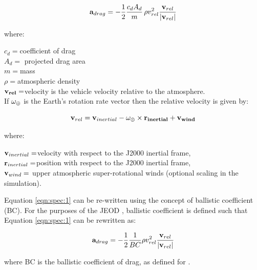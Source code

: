 \begin{equation}
{\bf{a}}_{drag}  =  - \frac{1}{2}\frac{{c_d A_d }}{m}\,\rho v^2 _{rel} \frac{{{\bf{v}}_{rel} }}{{\left| {{\bf{v}}_{rel} } \right|}}\label{eqn:spec:1}
\end{equation}

where:

$c_{d} =$coefficient of drag \\
$A_{d} =$ projected drag area \\
$m = $mass \\
$\rho  = $atmospheric density \\
$\bf{v}_{rel} = $velocity is the vehicle velocity relative to the atmosphere.\\

If ${\bf{\omega}} _ \oplus  $ is the Earth's rotation rate vector then the relative velocity is given by:

\begin{equation}
{\bf{v}}_{rel}  = {\bf{v}}_{inertial}  - \bf{\omega} _ \oplus   \times {\bf{r}}_{inertial}  + {\bf{v}}_{wind}
\end{equation}

where:

${\bf{v}}_{inertial} = $velocity with respect to the J2000 inertial frame,\\
${\bf{r}}_{inertial} = $position with respect to the J2000 inertial frame,\\
${\bf{v}}_{wind} = $   upper atmospheric super-rotational winds (optional scaling in the simulation).

Equation \eqref{eqn:spec:1} can be re-written using the concept of
ballistic coefficient (BC). For the purposes
of the JEOD \aerodynamicsDesc, ballistic coefficient
is defined such that Equation
\eqref{eqn:spec:1} can be rewritten as:

 \begin{equation}
 {\bf{a}}_{drag}  =  - \frac{1}{2}\frac{1}{BC} \rho v^2 _{rel} \frac{{{\bf{v}}_{rel} }}{{\left| {{\bf{v}}_{rel} } \right|}}\label{bc_aero_drag}
 \end{equation}

where BC is the ballistic coefficient of drag, as defined for \JEODid.

